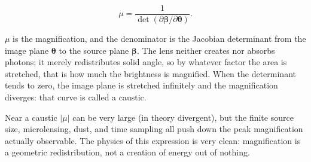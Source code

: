 \begin{equation}
  \mu
  =
  \frac{1}{\det\!\left(\partial{\boldsymbol\beta}/\partial{\boldsymbol\theta}\right)}.
  \label{eq:e21-magnification}
\end{equation}
\begin{formulaexplain}
\(\mu\) is the magnification, and the denominator is the Jacobian determinant from the image plane \({\boldsymbol\theta}\) to the source plane \({\boldsymbol\beta}\). The lens neither creates nor absorbs photons; it merely redistributes solid angle, so by whatever factor the area is stretched, that is how much the brightness is magnified. When the determinant tends to zero, the image plane is stretched infinitely and the magnification diverges: that curve is called a caustic.
\end{formulaexplain}
Near a caustic \(|\mu|\) can be very large (in theory divergent), but the finite source size, microlensing, dust, and time sampling all push down the peak magnification actually observable. The physics of this expression is very clean: magnification is a geometric redistribution, not a creation of energy out of nothing.

